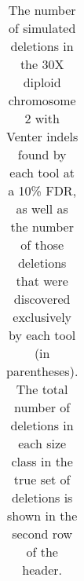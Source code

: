 \begin{table}[t]
\begin{center}
\begin{tabular}{rrrrrr}
   \hline
\end{tabular}
\end{center}
\caption{The number of simulated deletions in the 30X diploid chromosome 2 with Venter indels found by each tool at a 10\% FDR, as well as the number of those deletions that were discovered exclusively by each tool (in parentheses). The total number of deletions in each size class in the true set of deletions is shown in the second row of the header.}
\label{chr2DeletionPreds}
\end{table}
